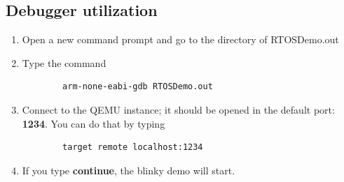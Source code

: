 \documentclass{article}
\begin{document}
\subsection{Debugger utilization}
\begin{enumerate}
    \item Open a new command prompt and go to the directory of RTOSDemo.out
    \item Type the command \begin{verbatim}
        arm-none-eabi-gdb RTOSDemo.out
    \end{verbatim}
    \item Connect to the QEMU instance; it should be opened in the default port: \textbf{1234}. You can do that by typing \begin{verbatim}
        target remote localhost:1234
    \end{verbatim}
    \item If you type \textbf{continue}, the blinky demo will start.
\end{enumerate}
\end{document}
